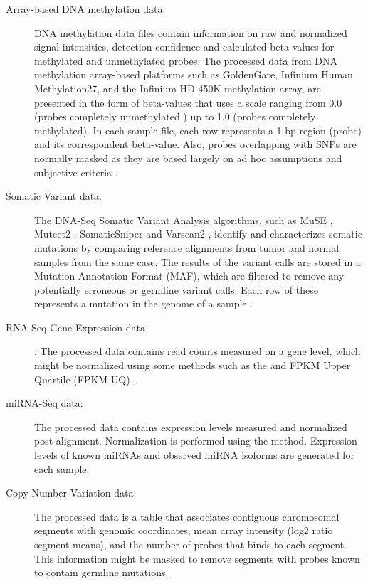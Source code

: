 \begin{description}
  \item [Array-based DNA methylation data:]
  DNA methylation data files contain information on raw and normalized signal intensities, detection confidence and calculated beta values for methylated and unmethylated probes.
  The processed data from DNA methylation array-based platforms such as GoldenGate, Infinium Human Methylation27, and the Infinium HD 450K methylation array, are presented in the form of beta-values that uses a scale ranging from 0.0 (probes completely unmethylated ) up to 1.0 (probes completely methylated). In each sample file, each row represents a 1 bp region (probe) and its correspondent beta-value. Also, probes overlapping with SNPs are normally masked as they are based largely on ad hoc assumptions and subjective criteria \cite{zhou2016comprehensive}.
  \item [Somatic Variant data:]  The DNA-Seq Somatic Variant Analysis algorithms, such as MuSE \cite{fan2016muse}, Mutect2 \cite{cibulskis2013sensitive}, SomaticSniper \cite{larson2011somaticsniper} and Varscan2 \cite{koboldt2012varscan},   identify and characterizes somatic mutations by comparing reference alignments from tumor and normal samples from the same case.  The   results of the variant calls are stored in a Mutation Annotation Format (MAF), which are filtered to remove any potentially erroneous or germline variant calls. Each row of these  represents a mutation in the genome of a sample \cite{GDC_maf}.
  \item [RNA-Seq Gene Expression data]: The processed data contains read counts measured on a gene level, which might be normalized using some methods such as the  \cite{GDC_fpmk} and FPKM Upper Quartile (FPKM-UQ) \cite{GDC_fpmkuq}.
  \item [miRNA-Seq data:] The processed data contains expression levels measured and normalized post-alignment. Normalization is performed using the  method. Expression levels of known miRNAs and observed miRNA isoforms are generated for each sample.
  \item [Copy Number Variation data:] The processed data is a table that associates contiguous chromosomal segments with genomic coordinates, mean array intensity (log2 ratio segment means), and the number of probes that binds to each segment. This information might be masked to remove segments with probes known to contain germline mutations.

\end{description}
